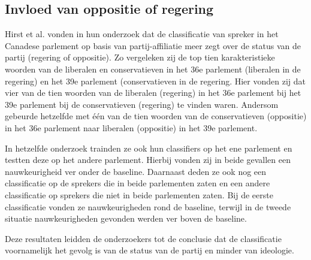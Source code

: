 \subsection{Invloed van oppositie of regering}
Hirst et al. vonden in hun onderzoek dat de classificatie van spreker in het Canadese parlement op basis van partij-affiliatie meer zegt over de status van de partij (regering of oppositie).\cite{Hirst_textto} Zo vergeleken zij de top tien karakteristieke woorden van de liberalen en conservatieven in het 36e parlement (liberalen in de regering) en het 39e parlement (conservatieven in de regering. Hier vonden zij dat vier van de tien woorden van de liberalen (regering) in het 36e parlement bij het 39e parlement bij de conservatieven (regering) te vinden waren. Andersom gebeurde hetzelfde met één van de tien woorden van de conservatieven (oppositie) in het 36e parlement naar liberalen (oppositie) in het 39e parlement.\par
In hetzelfde onderzoek trainden ze ook hun classifiers op het ene parlement en testten deze op het andere parlement. Hierbij vonden zij in beide gevallen een nauwkeurigheid ver onder de baseline. Daarnaast deden ze ook nog een classificatie op de sprekers die in beide parlementen zaten en een andere classificatie op sprekers die niet in beide parlementen zaten. Bij de eerste classificatie vonden ze nauwkeurigheden rond de baseline, terwijl in de tweede situatie nauwkeurigheden gevonden werden ver boven de baseline. \par
Deze resultaten leidden de onderzoekers tot de conclusie dat de classificatie voornamelijk het gevolg is van de status van de partij en minder van ideologie.\par



